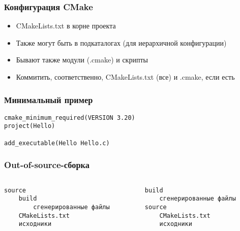 \documentclass{../../slides-style}
\begin{document}
    \begin{frame}
        \frametitle{Конфигурация CMake}
        \begin{itemize}
            \item CMakeLists.txt в корне проекта
            \item Также могут быть в подкаталогах (для иерархичной конфигурации)
            \item Бывают также модули (.cmake) и скрипты
            \item Коммитить, соответственно, CMakeLists.txt (все) и .cmake, если есть
        \end{itemize}
    \end{frame}

    \begin{frame}[fragile]
        \frametitle{Минимальный пример}
        \begin{verbatim}
cmake_minimum_required(VERSION 3.20)
project(Hello)

add_executable(Hello Hello.c)
        \end{verbatim}
    \end{frame}

    \begin{frame}[fragile]
        \frametitle{Out-of-source-сборка}
        \begin{columns}
            \begin{column}{0.5\textwidth}
                \begin{verbatim}
source
    build
        сгенерированные файлы
    CMakeLists.txt
    исходники
                \end{verbatim}
            \end{column}
            \begin{column}{0.5\textwidth}
                \begin{verbatim}
build
    сгенерированные файлы
source
    CMakeLists.txt
    исходники
                \end{verbatim}
            \end{column}
        \end{columns}
    \end{frame}
\end{document}
